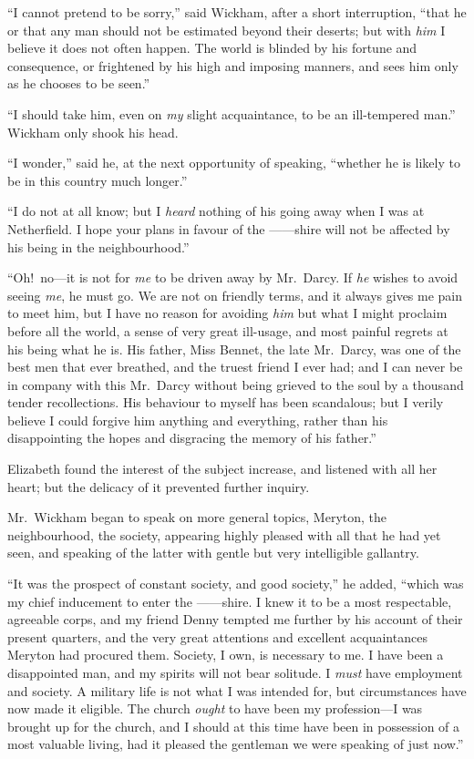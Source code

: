 \documentclass[12pt,english,oneside]{book}
\begin{document}
{}``I cannot pretend to be sorry,'' said Wickham, after a short
interruption, {}``that he or that any man should not be estimated
beyond their deserts; but with \textit{him} I believe it does not
often happen. The world is blinded by his fortune and consequence,
or frightened by his high and imposing manners, and sees him only
as he chooses to be seen.''

{}``I should take him, even on \textit{my} slight acquaintance, to
be an ill-tempered man.'' Wickham only shook his head.

{}``I wonder,'' said he, at the next opportunity of speaking, {}``whether
he is likely to be in this country much longer.''

{}``I do not at all know; but I \textit{heard} nothing of his going
away when I was at Netherfield. I hope your plans in favour of the
\mbox{------}shire will not be affected by his being in the neighbourhood.''

{}``Oh!\ no\mbox{---}it is not for \textit{me} to be driven away
by Mr.\ Darcy. If \textit{he} wishes to avoid seeing \textit{me},
he must go. We are not on friendly terms, and it always gives me pain
to meet him, but I have no reason for avoiding \textit{him} but what
I might proclaim before all the world, a sense of very great ill-usage,
and most painful regrets at his being what he is. His father, Miss
Bennet, the late Mr.\ Darcy, was one of the best men that ever breathed,
and the truest friend I ever had; and I can never be in company with
this Mr.\ Darcy without being grieved to the soul by a thousand tender
recollections. His behaviour to myself has been scandalous; but I
verily believe I could forgive him anything and everything, rather
than his disappointing the hopes and disgracing the memory of his
father.''

Elizabeth found the interest of the subject increase, and listened
with all her heart; but the delicacy of it prevented further inquiry.

Mr.\ Wickham began to speak on more general topics, Meryton, the
neighbourhood, the society, appearing highly pleased with all that
he had yet seen, and speaking of the latter with gentle but very intelligible
gallantry.

{}``It was the prospect of constant society, and good society,''
he added, {}``which was my chief inducement to enter the \mbox{------}shire.
I knew it to be a most respectable, agreeable corps, and my friend
Denny tempted me further by his account of their present quarters,
and the very great attentions and excellent acquaintances Meryton
had procured them. Society, I own, is necessary to me. I have been
a disappointed man, and my spirits will not bear solitude. I \textit{must}
have employment and society. A military life is not what I was intended
for, but circumstances have now made it eligible. The church \textit{ought}
to have been my profession\mbox{---}I was brought up for the church,
and I should at this time have been in possession of a most valuable
living, had it pleased the gentleman we were speaking of just now.''
\end{document}

